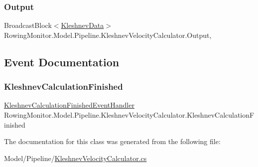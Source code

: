 \subsubsection{\texorpdfstring{Output}{Output}}
{\footnotesize\ttfamily Broadcast\+Block$<$\hyperlink{struct_rowing_monitor_1_1_model_1_1_pipeline_1_1_kleshnev_data}{Kleshnev\+Data}$>$ Rowing\+Monitor.\+Model.\+Pipeline.\+Kleshnev\+Velocity\+Calculator.\+Output\hspace{0.3cm}{\ttfamily [get]}, {\ttfamily [set]}}



\subsection{Event Documentation}
\mbox{\label{class_rowing_monitor_1_1_model_1_1_pipeline_1_1_kleshnev_velocity_calculator_afc60a4e7b76e1bfd9c12b5aacda05a51}} 
\subsubsection{\texorpdfstring{Kleshnev\+Calculation\+Finished}{KleshnevCalculationFinished}}
{\footnotesize\ttfamily \hyperlink{class_rowing_monitor_1_1_model_1_1_pipeline_1_1_kleshnev_velocity_calculator_aa8c251dc416d32f364bf138f4abeada7}{Kleshnev\+Calculation\+Finished\+Event\+Handler} Rowing\+Monitor.\+Model.\+Pipeline.\+Kleshnev\+Velocity\+Calculator.\+Kleshnev\+Calculation\+Finished}



The documentation for this class was generated from the following file\+:\begin{DoxyCompactItemize}
\item 
Model/\+Pipeline/\hyperlink{_kleshnev_velocity_calculator_8cs}{Kleshnev\+Velocity\+Calculator.\+cs}\end{DoxyCompactItemize}
